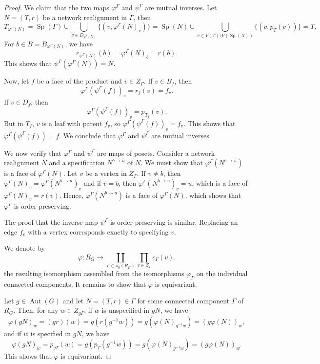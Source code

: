\documentclass[reqno,dvipsnames]{amsart}
\theoremstyle{plain}
\numberwithin{equation}{section}
\theoremstyle{definition}
\DeclareMathOperator{\Sp}{Sp}
\DeclareMathOperator{\Aut}{Aut}
\begin{document}
\begin{proof}
	We claim that the two maps $\varphi^\Gamma$ and $\psi^\Gamma$ are mutual inverses. Let $N = (T,r)$ be a network realignment in $\Gamma$, then
	\[
	T_{\varphi^\Gamma(N)} = \Sp(\Gamma) \cup \bigcup_{v\in D_{\varphi^\Gamma(N)}}\{(v,\varphi^\Gamma(N)_v)\} = \Sp(N) \cup \bigcup_{v\in V(T)\setminus V(\Sp(N))}\{(v,p_T(v))\} = T.
	\]
	For $b\in B = B_{\varphi^\Gamma(N)}$, we have
	\[
	r_{\varphi^\Gamma(N)}(b) = \varphi^\Gamma(N)_b = r(b).
	\]
	This shows that $\psi^\Gamma(\varphi^\Gamma(N)) = N$.
	
	Now, let $f$ be a face of the product and $v\in Z_\Gamma$. If $v\in B_f$, then 
	\[
	\varphi^\Gamma(\psi^\Gamma(f))_v = r_f(v) = f_v.
	\] 
	If $v\in D_f$, then
	\[
	\varphi^\Gamma(\psi^\Gamma(f))_v = p_{T_f}(v).
	\]
	But in $T_f$, $v$ is a leaf with parent $f_v$, so $\varphi^\Gamma(\psi^\Gamma(f))_v = f_v$. This shows that $\varphi^\Gamma(\psi^\Gamma(f)) = f$. We conclude that $\varphi^\Gamma$ and $\psi^\Gamma$ are mutual inverses.
	
	We now verify that $\varphi^\Gamma$ and $\psi^\Gamma$ are maps of posets. Consider a network realignment $N$ and a specification $N^{b\to u}$ of $N$. We must show that $\varphi^\Gamma(N^{b\to u})$ is a face of $\varphi^\Gamma(N)$. Let $v$ be a vertex in $Z_\Gamma$. If $v\neq b$, then $\varphi^\Gamma(N)_v = \varphi^\Gamma(N^{b\to u})_v$ and if $v = b$, then $\varphi^\Gamma(N^{b\to u})_v = u$, which is a face of $\varphi^\Gamma(N)_v = r(v)$. Hence, $\varphi^\Gamma(N^{b\to u})$ is a face of $\varphi^\Gamma(N)$, which shows that $\varphi^\Gamma$ is order preserving. 
	
	The proof that the inverse map $\psi^\Gamma$ is order preserving is similar. Replacing an edge $f_v$ with a vertex corresponds exactly to specifying $v$.
	
	We denote by 
	\[
	\varphi\colon R_G \to \coprod_{\Gamma\in \pi_0(R_G)}\prod_{v\in Z_\Gamma} c_\Gamma(v).
	\]
	the resulting isomorphism assembled from the isomorphisms $\varphi_\Gamma$ on the individual connected components. It remains to show that $\varphi$ is equivariant.
	
	Let $g\in \Aut(G)$ and let $N = (T,r)\in \Gamma$ for some connected component $\Gamma$ of $R_G$. Then, for any $w\in Z_{g\Gamma}$, if $w$ is unspecified in $gN$, we have
	\[
	\varphi(gN)_w = (gr)(w) = g(r(g^{-1}w)) = g (\varphi(N)_{g^{-1}w}) = (g\varphi(N))_w,
	\]
	and if $w$ is specified in $gN$, we have
	\[
	\varphi(gN)_w = p_{gT}(w) = g(p_{T}(g^{-1}w)) = g(\varphi(N)_{g^{-1}w}) = (g\varphi(N))_w.
	\]
	This shows that $\varphi$ is equivariant.
\end{proof}
\end{document}
